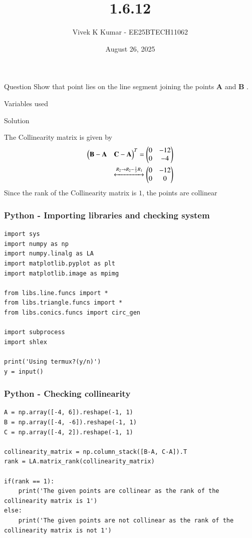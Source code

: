 \documentclass{beamer}
\title 
{1.6.12}
\date{August 26, 2025}
\author 
{Vivek K Kumar - EE25BTECH11062}
\begin{document}
\frame{\titlepage}
\begin{frame}{Question}
Show that point  lies on the line segment joining the points \textbf{A}  and \textbf{B} .
\end{frame}



\begin{frame}{Variables used}
\begin{table}[H]    
  \centering
  
  \caption{Variables Used}
  \label{tab:1.6.12}
\end{table}

\end{frame}

\begin{frame}{Solution}

The Collinearity matrix is given by\\
\begin{align}
\begin{pmatrix}
   \mathbf{B}-\mathbf{A} & \mathbf{C}-\mathbf{A}
 \end{pmatrix}^T = \begin{pmatrix}
   0 & -12 \\
   0 & -4
   \end{pmatrix}\\
 \xleftrightarrow[]{R_2 \rightarrow {R_2-\frac{1}{3}R_1}}
 \begin{pmatrix}
   0 & -12
   \\
   0 & 0
   \end{pmatrix}
\end{align}
Since the rank of the Collinearity matrix is $1$, the points are collinear

\end{frame}

\begin{frame}[fragile]
    \frametitle{Python - Importing libraries and checking system}
    \begin{lstlisting}
import sys
import numpy as np
import numpy.linalg as LA
import matplotlib.pyplot as plt
import matplotlib.image as mpimg

from libs.line.funcs import *
from libs.triangle.funcs import *
from libs.conics.funcs import circ_gen

import subprocess
import shlex

print('Using termux?(y/n)')
y = input()
\end{lstlisting}
\end{frame}

\begin{frame}[fragile]
    \frametitle{Python - Checking collinearity}
    \begin{lstlisting}
A = np.array([-4, 6]).reshape(-1, 1)
B = np.array([-4, -6]).reshape(-1, 1)
C = np.array([-4, 2]).reshape(-1, 1)

collinearity_matrix = np.column_stack([B-A, C-A]).T
rank = LA.matrix_rank(collinearity_matrix)

if(rank == 1):
    print('The given points are collinear as the rank of the collinearity matrix is 1')
else:
    print('The given points are not collinear as the rank of the collinearity matrix is not 1')
\end{lstlisting}
\end{frame}
\end{document}
